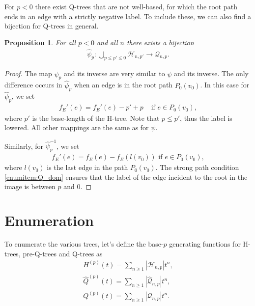 \documentclass[11pt]{article}
\theoremstyle{plain}
\newtheorem{proposition}[theorem]{Proposition}
\theoremstyle{definition}
\begin{document}
For $p<0$ there exist Q-trees that are not well-based, for which the root path ends in an edge with a strictly negative label.
To include these, we can also find a bijection for Q-trees in general.

\begin{proposition}
    For all $p<0$ and all $n$ there exists a bijection
    \begin{align}
        \hat{\psi}_p: \bigcup_{p\leq p' \leq0}\mathcal{H}_{n,p'} \rightarrow \mathcal{Q}_{n,p}.
    \end{align}
\end{proposition}
\begin{proof}
    The map $\hat{\psi}_p$ and its inverse are very similar to $\psi$ and its inverse. 
    The only difference occurs in $\hat{\psi}_p$ when an edge is in the root path $P_0(v_0)$.
    In this case for $\hat{\psi}_p$, we set 
    \begin{align}
        f_E'(e)=f_E'(e)-p'+p &\textrm{ if }e\in P_0(v_0),
    \end{align}
    where $p'$ is the base-length of the H-tree. 
    Note that $p\leq p'$, thus the label is lowered.
    All other mappings are the same as for $\psi$. 

    Similarly, for $\hat{\psi}^{-1}_p$, we set 
    \begin{align}
        f_E'(e)=f_E(e) - f_E(l(v_0)) \textrm{ if }e\in P_0(v_0),
    \end{align}
    where $l(v_0)$ is the last edge in the path $P_0(v_0)$.
    The strong path condition \ref{enumitem:Q_dom} ensures that the label of the edge incident to the root in the image is between $p$ and $0$. 
\end{proof}

\FloatBarrier
\section{Enumeration}\label{sec:enumeration}
\FloatBarrier

To enumerate the various trees, let's define the base-$p$ generating functions for H-trees, pre-Q-trees and Q-trees as
\begin{align}
    H^{(p)}(t)=\sum_{n\geq1} |\mathcal{H}_{n,p}| t^n,\\
    \hat{Q}^{(p)}(t)=\sum_{n\geq1} |\hat{\mathcal{Q}}_{n,p}| t^n,\\
    Q^{(p)}(t)=\sum_{n\geq1} |\mathcal{Q}_{n,p}| t^n.
\end{align}
\end{document}
